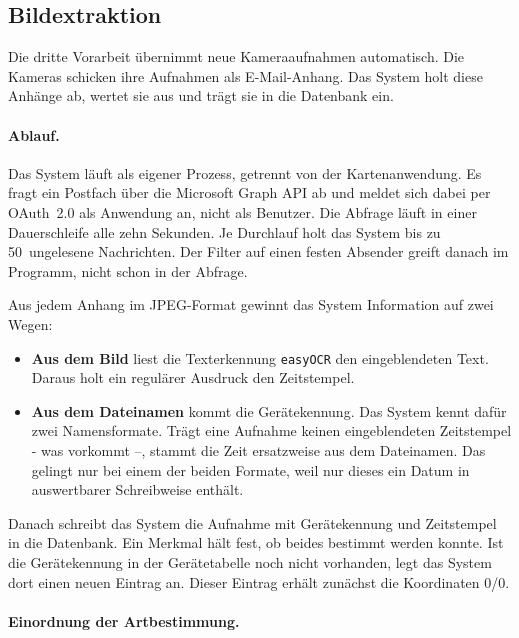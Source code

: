 \documentclass[12pt,a4paper]{report}
\begin{document}
\subsection{Bildextraktion}
\label{subsec:bildextraktion}

Die dritte Vorarbeit \cite{LelchatBA} übernimmt neue Kameraaufnahmen automatisch. Die
Kameras schicken ihre Aufnahmen als E-Mail-Anhang. Das System holt diese Anhänge ab, wertet
sie aus und trägt sie in die Datenbank ein.

\paragraph{Ablauf.}

Das System läuft als eigener Prozess, getrennt von der Kartenanwendung. Es fragt ein
Postfach über die Microsoft Graph API ab und meldet sich dabei per OAuth~2.0 als Anwendung
an, nicht als Benutzer. Die Abfrage läuft in einer Dauerschleife alle zehn Sekunden. Je
Durchlauf holt das System bis zu 50~ungelesene Nachrichten. Der Filter auf einen festen
Absender greift danach im Programm, nicht schon in der Abfrage.

Aus jedem Anhang im JPEG-Format gewinnt das System Information auf zwei Wegen:

\begin{itemize}
    \item \textbf{Aus dem Bild} liest die Texterkennung \texttt{easyOCR} den eingeblendeten
    Text. Daraus holt ein regulärer Ausdruck den Zeitstempel.
    \item \textbf{Aus dem Dateinamen} kommt die Gerätekennung. Das System kennt dafür zwei
    Namensformate. Trägt eine Aufnahme keinen eingeblendeten Zeitstempel - was vorkommt
    \cite[S.~25]{LelchatBA} --, stammt die Zeit ersatzweise aus dem Dateinamen. Das gelingt
    nur bei einem der beiden Formate, weil nur dieses ein Datum in auswertbarer
    Schreibweise enthält.
\end{itemize}

Danach schreibt das System die Aufnahme mit Gerätekennung und Zeitstempel in die Datenbank.
Ein Merkmal hält fest, ob beides bestimmt werden konnte. Ist die Gerätekennung in der
Gerätetabelle noch nicht vorhanden, legt das System dort einen neuen Eintrag an. Dieser
Eintrag erhält zunächst die Koordinaten 0/0.

\paragraph{Einordnung der Artbestimmung.}
\end{document}
